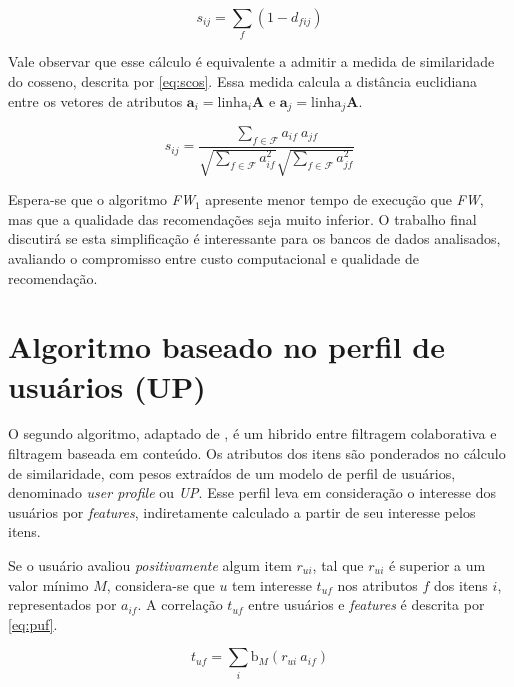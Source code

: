 \begin{equation} 
\label{eq:sij1}
    s_{ij} = \sum_{f}{\left(1-d_{fij}\right)}
\end{equation}

Vale observar que esse cálculo é equivalente a admitir a medida de similaridade do cosseno, descrita por \ref{eq:scos}. Essa medida calcula a distância euclidiana entre os vetores de atributos $\mathbf{a}_i = \mathrm{linha}_i \mathbf{A}$ e $\mathbf{a}_j = \mathrm{linha}_j \mathbf{A}$.

\begin{equation} 
\label{eq:scos}
    s_{ij} = \frac{\sum\limits_{f \in \mathcal{F}}{a_{if}~a_{jf}}}{\sqrt{\sum\limits_{f \in \mathcal{F}}a_{if}^2} \sqrt{\sum\limits_{f \in \mathcal{F}}a_{jf}^2}}
\end{equation}

Espera-se que o algoritmo \textit{FW$_1$} apresente menor tempo de execução que \textit{FW}, mas que a qualidade das recomendações seja muito inferior. O trabalho final discutirá se esta simplificação é interessante para os bancos de dados analisados, avaliando o compromisso entre custo computacional e qualidade de recomendação.


\section{Algoritmo baseado no perfil de usuários (UP)} %
\label{sec:algoritmo_baseado_no_perfil_de_usu_rios_}


O segundo algoritmo, adaptado de \cite{debnath2008feature}, é um hibrido entre filtragem colaborativa e filtragem baseada em conteúdo. Os atributos dos itens são ponderados no cálculo de similaridade, com pesos extraídos de um modelo de perfil de usuários, denominado \textit{user profile} ou \textit{UP}. Esse perfil leva em consideração o interesse dos usuários por \textit{features}, indiretamente calculado a partir de seu interesse pelos itens. 

Se o usuário avaliou \textit{positivamente} algum item $r_{ui}$, tal que $r_{ui}$ é superior a um valor mínimo $M$, considera-se que $u$ tem interesse $t_{uf}$ nos atributos $f$ dos itens $i$, representados por $a_{if}$. A correlação $t_{uf}$ entre usuários e \textit{features} é descrita por \ref{eq:puf}.

\begin{equation}
\label{eq:puf} 
    t_{uf} = \sum_{i}{\mathrm{b}_M\left(r_{ui}~a_{if}\right)} 
\end{equation} 


